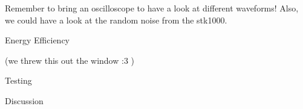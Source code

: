 

Remember to bring an oscilloscope to have a look at different waveforms! Also, we could have a look at the random noise from the stk1000.

Energy Efficiency

(we threw this out the window :3 )


Testing


Discussion
